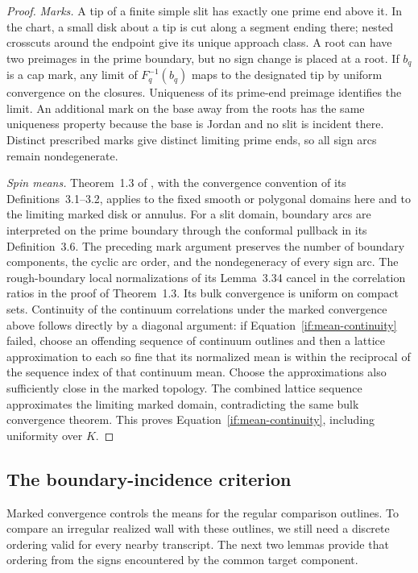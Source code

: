 \begin{proof}
\emph{Marks.}
A tip of a finite simple slit has exactly one prime end above it.
In the chart, a small disk about a tip is cut along a segment ending
there; nested crosscuts around the endpoint give its unique approach
class.  A root can have two preimages in the prime boundary, but no
sign change is placed at a root.  If $b_q$ is a cap mark, any limit of
$F_q^{-1}(b_q)$ maps to the designated tip by uniform convergence on
the closures.  Uniqueness of its prime-end preimage identifies the
limit.  An additional mark on the base away from the roots has the
same uniqueness property because the base is Jordan and no slit is
incident there.  Distinct prescribed marks give distinct limiting
prime ends, so all sign arcs remain nondegenerate.

\emph{Spin means.}
Theorem~1.3 of \cite{CHI2021}, with the convergence convention of its
Definitions~3.1--3.2, applies to the fixed smooth or polygonal domains
here and to the limiting marked disk or annulus. For a slit domain,
boundary arcs are interpreted on the prime boundary through the
conformal pullback in its Definition~3.6. The preceding mark argument
preserves the number of boundary components, the cyclic arc order,
and the nondegeneracy of every sign arc. The rough-boundary local
normalizations of its Lemma~3.34 cancel in the correlation ratios in
the proof of Theorem~1.3. Its bulk convergence is
uniform on compact sets.  Continuity of the continuum correlations
under the marked convergence above follows directly by a diagonal
argument: if Equation~\eqref{if:mean-continuity} failed, choose an
offending sequence of continuum outlines and then a lattice
approximation to each so fine that its normalized mean is within the
reciprocal of the sequence index of that continuum mean.  Choose the
approximations also sufficiently close in the marked topology.  The
combined lattice sequence approximates the limiting marked domain,
contradicting the same bulk convergence theorem.  This proves
Equation~\eqref{if:mean-continuity}, including uniformity over $K$.
\end{proof}

\subsection{The boundary-incidence criterion}

Marked convergence controls the means for the regular comparison
outlines. To compare an irregular realized wall with these outlines,
we still need a discrete ordering valid for every nearby transcript.
The next two lemmas provide that ordering from the signs encountered
by the common target component.

